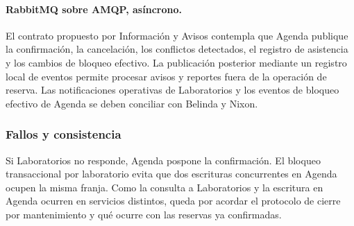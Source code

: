\paragraph{RabbitMQ sobre AMQP, asíncrono.}
El contrato propuesto por Información y Avisos contempla que Agenda
publique la confirmación, la cancelación, los conflictos detectados,
el registro de asistencia y los cambios de bloqueo efectivo. La
publicación posterior mediante un registro local de eventos permite
procesar avisos y reportes fuera de la operación de reserva. Las
notificaciones operativas de Laboratorios y los eventos de bloqueo
efectivo de Agenda se deben conciliar con Belinda y Nixon.

\subsubsection{Fallos y consistencia}
Si Laboratorios no responde, Agenda pospone la confirmación. El bloqueo
transaccional por laboratorio evita que dos escrituras concurrentes en
Agenda ocupen la misma franja. Como la consulta a Laboratorios y la
escritura en Agenda ocurren en servicios distintos, queda por acordar
el protocolo de cierre por mantenimiento y qué ocurre con las reservas
ya confirmadas.
